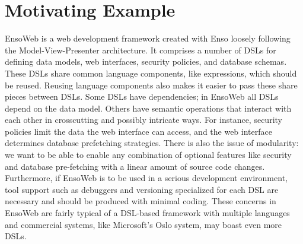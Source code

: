 \section{Motivating Example}


EnsoWeb is a web development framework created with Enso loosely following the Model-View-Presenter architecture. It comprises a number of DSLs for defining data models, web interfaces, security policies, and database schemas. These DSLs share common language components, like expressions, which should be reused. Reusing language components also makes it easier to pass these share pieces between DSLs. Some DSLs have dependencies; in EnsoWeb all DSLs depend on the data model. Others have semantic operations that interact with each other in crosscutting and possibly intricate ways. For instance, security policies limit the data the web interface can access, and the web interface determines database prefetching strategies. There is also the issue of modularity: we want to be able to enable any combination of optional features like security and database pre-fetching with a linear amount of source code changes. Furthermore, if EnsoWeb is to be used in a serious development environment, tool support such as debuggers and versioning specialized for each DSL are necessary and should be produced with minimal coding. These concerns in EnsoWeb are fairly typical of a DSL-based framework with multiple languages and commercial systems, like Microsoft's Oslo system, may boast even more DSLs.

